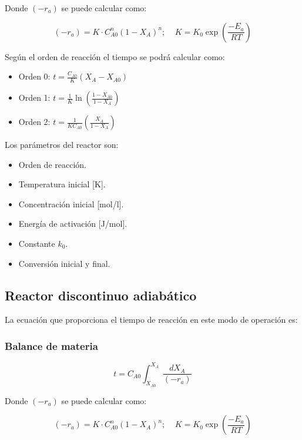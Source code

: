 \documentclass[20pt,a4paper]{extarticle}
\begin{document}
			Donde $(-r_a)$ se puede calcular como:
		
			\begin{equation*}
				(-r_a) = K \cdot C_{A0}^n (1-X_A)^n; ~~~~~ K = K_0\exp\left(\frac{-E_a}{RT}\right)
			\end{equation*}
			
			Según el orden de reacción el tiempo se podrá calcular como:
			
			\begin{itemize}
				\item Orden 0: $ t = \frac{C_{A0}}{K}(X_A-X_{A0})$
				\item Orden 1: $ t = \frac{1}{K}\ln\left(\frac{1-X_{A0}}{1-X_A}\right)$
				\item Orden 2: $ t = \frac{1}{KC_{A0}}\left(\frac{X_A}{1- X_A}\right)$
			\end{itemize}
		
		Los parámetros del reactor son: 
		\begin{itemize}
			\item Orden de reacción.
			\item Temperatura inicial [K].
			\item Concentración inicial [mol/l].
			\item Energía de activación [J/mol].
			\item Constante $k_0$.
			\item Conversión inicial y final.
		\end{itemize}
	
	
	\subsection{Reactor discontinuo adiabático}
		La ecuación que proporciona el tiempo de reacción en este modo de operación es:
	
		\subsubsection{Balance de materia}
			\begin{equation*}
			t = C_{A0}\int_{X_{A0}}^{X_A}\frac{dX_A}{(-r_a)}
			\end{equation*}
			
			Donde $(-r_a)$ se puede calcular como:
			
			\begin{equation*}
			(-r_a) = K \cdot C_{A0}^n (1-X_A)^n; ~~~~~ K = K_0\exp\left(\frac{-E_a}{RT}\right)
			\end{equation*}
			
\end{document}
